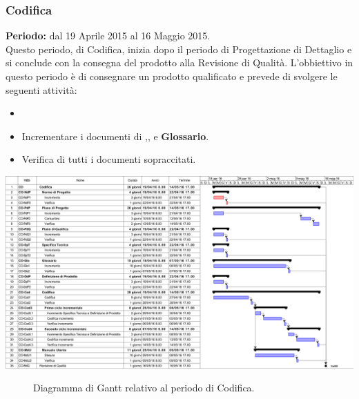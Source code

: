 \subsubsection{Codifica}
\textbf{Periodo:} dal 19 Aprile 2015 al 16 Maggio 2015. \\
Questo periodo, di Codifica, inizia dopo il periodo di Progettazione di Dettaglio e si conclude con la consegna del prodotto alla Revisione di Qualità. L'obbiettivo in questo periodo è di consegnare un prodotto qualificato e prevede di svolgere le seguenti attività:
\begin{itemize}
	\item   
	\item Incrementare i documenti di \textbf{\NdP},\textbf{\PdP}, \textbf{\PdQ} e \textbf{Glossario}.
	\item Verifica di tutti i documenti sopraccitati.
\end{itemize}
\begin{center}
	\includegraphics[keepaspectratio = true, width=15cm]{immagini/PdP_CodificaGantt.png}
\end{center}
\begin{figure}[h]
	\caption{Diagramma di Gantt relativo al periodo di Codifica.}\label{etichetta}
\end{figure}

